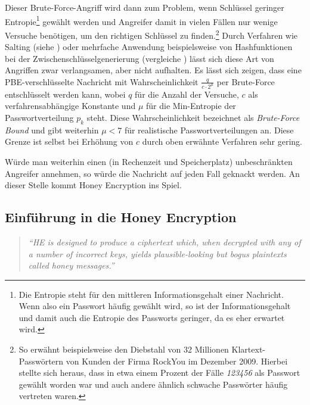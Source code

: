 Dieser Brute-Force-Angriff wird dann zum Problem, wenn Schlüssel geringer Entropie\footnote{Die Entropie steht für den mittleren Informationsgehalt einer Nachricht. Wenn also ein Passwort häufig gewählt wird, so ist der Informationsgehalt und damit auch die Entropie des Passworts geringer, da es eher erwartet wird.} gewählt werden und Angreifer damit in vielen Fällen nur wenige Versuche benötigen, um den richtigen Schlüssel zu finden.\footnote{So erwähnt \cite{IEEE2014} beispielsweise den Diebstahl von 32 Millionen Klartext-Passwörtern von Kunden der Firma RockYou im Dezember 2009. Hierbei stellte sich heraus, dass in etwa einem Prozent der Fälle \emph{123456} als Passwort gewählt worden war und auch andere ähnlich schwache Passwörter häufig vertreten waren.} Durch Verfahren wie Salting (siehe \cite{Schneier2006}) oder mehrfache Anwendung beispielsweise von Hashfunktionen bei der Zwischenschlüsselgenerierung (vergleiche \cite{pbkdf2000}) lässt sich diese Art von Angriffen zwar verlangsamen, aber nicht aufhalten. Es lässt sich zeigen, dass eine PBE-verschlüsselte Nachricht mit Wahrscheinlichkeit \(\frac{q}{c \cdot 2^{\mu}}\) per Brute-Force entschlüsselt werden kann, wobei \(q\) für die Anzahl der Versuche, \(c\) als verfahrensabhängige Konstante und \(\mu\) für die Min-Entropie der Passwortverteilung \(p_k\) steht. Diese Wahrscheinlichkeit bezeichnet \cite{EURO2014} als \textit{Brute-Force Bound} und gibt weiterhin \(\mu<7\) für realistische Passwortverteilungen an. Diese Grenze ist selbst bei Erhöhung von \(c\) durch oben erwähnte Verfahren sehr gering.

Würde man weiterhin einen (in Rechenzeit und Speicherplatz) unbeschränkten Angreifer annehmen, so würde die Nachricht auf jeden Fall geknackt werden. An dieser Stelle kommt Honey Encryption ins Spiel.

\subsection{Einführung in die Honey Encryption}
\label{sec:funktionsweise-beispiel}

\begin{quote}
\textit{"`HE is designed to produce a ciphertext which, when decrypted with any of a number of
incorrect keys, yields plausible-looking but bogus plaintexts called honey messages."'} \cite{EURO2014}
\end{quote}

